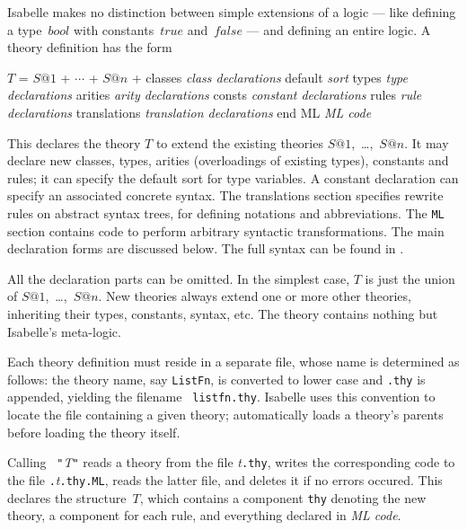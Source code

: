 Isabelle makes no distinction between simple extensions of a logic --- like
defining a type~$bool$ with constants~$true$ and~$false$ --- and defining
an entire logic.  A theory definition has the form
\begin{ttbox}
\(T\) = \(S@1\) + \(\cdots\) + \(S@n\) +
classes      {\it class declarations}
default      {\it sort}
types        {\it type declarations}
arities      {\it arity declarations}
consts       {\it constant declarations}
rules        {\it rule declarations}
translations {\it translation declarations}
end
ML           {\it ML code}
\end{ttbox}
This declares the theory $T$ to extend the existing theories
$S@1$,~\ldots,~$S@n$.  It may declare new classes, types, arities
(overloadings of existing types), constants and rules; it can specify the
default sort for type variables.  A constant declaration can specify an
associated concrete syntax.  The translations section specifies rewrite
rules on abstract syntax trees, for defining notations and abbreviations.
The {\tt ML} section contains code to perform arbitrary syntactic
transformations.  The main declaration forms are discussed below.
The full syntax can be found in .

All the declaration parts can be omitted.  In the simplest case, $T$ is
just the union of $S@1$,~\ldots,~$S@n$.  New theories always extend one
or more other theories, inheriting their types, constants, syntax, etc.
The theory  contains nothing but Isabelle's meta-logic.

Each theory definition must reside in a separate file, whose name is
determined as follows: the theory name, say {\tt ListFn}, is converted to
lower case and {\tt.thy} is appended, yielding the filename {\tt
  listfn.thy}.  Isabelle uses this convention to locate the file containing
a given theory;  automatically loads a theory's
parents before loading the theory itself.

Calling ~{\tt"}{\it T\/}{\tt"} reads a theory from the
file {\it t}{\tt.thy}, writes the corresponding {\ML} code to the file
{\tt.}{\it t}{\tt.thy.ML}, reads the latter file, and deletes it if no errors
occured.  This declares the {\ML} structure~$T$, which contains a component
{\tt thy} denoting the new theory, a component for each rule, and everything
declared in {\it ML code}.

